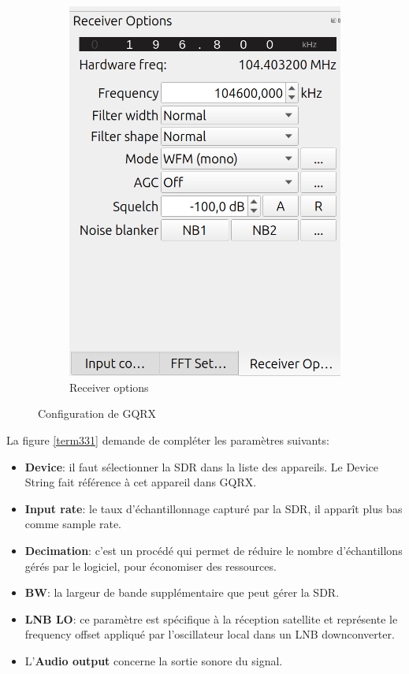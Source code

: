 \begin{figure}[h]
\begin{subfigure}{0.35\textwidth}
  \includegraphics[width=\textwidth]{images/gqrx3.png}
  \caption{Receiver options}
  \label{term341}
\end{subfigure}
\caption{Configuration de GQRX}
\label{term37}
\end{figure}

La figure \ref{term331} demande de compléter les paramètres suivants:

\vspace{0.1cm}

\begin{itemize}
\item \textbf{Device}: il faut sélectionner la \ac{SDR} dans la liste des appareils. Le Device String fait référence à cet appareil dans GQRX.
\item \textbf{Input rate}: le taux d'échantillonnage capturé par la \ac{SDR}, il apparît plus bas comme sample rate.
\item \textbf{Decimation}: c'est un procédé qui permet de réduire le nombre d'échan\-tillons gérés par le logiciel, pour économiser des ressources.
\item \textbf{\ac{BW}}: la largeur de bande supplémentaire que peut gérer la \ac{SDR}.
\item \textbf{\ac{LNB LO}}: ce paramètre est spécifi\-que à la réception satellite et représente le frequency offset appliqué par l'oscillateur local dans un LNB downconverter.
\item L'\textbf{Audio output} concerne la sortie sonore du signal.
\end{itemize}

